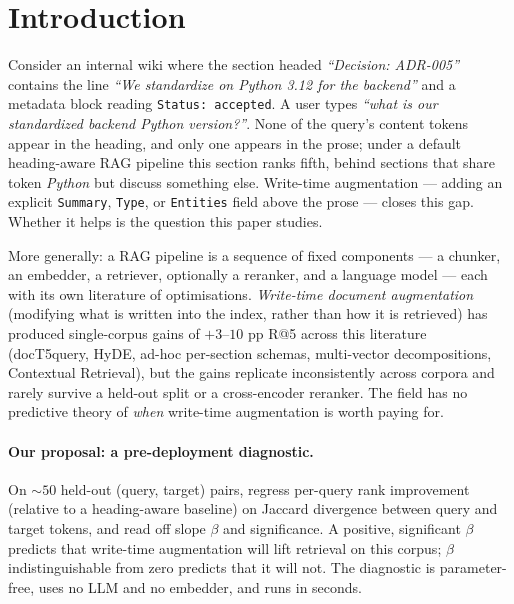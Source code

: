 \documentclass[11pt]{article}
\begin{document}
\section{Introduction}
\label{sec:intro}

Consider an internal wiki where the section headed
\textit{``Decision: ADR-005''} contains the line
\textit{``We standardize on Python 3.12 for the backend''} and a
metadata block reading \texttt{Status: accepted}. A user types
\textit{``what is our standardized backend Python version?''}. None
of the query's content tokens appear in the heading, and only one
appears in the prose; under a default heading-aware RAG pipeline this
section ranks fifth, behind sections that share token \emph{Python}
but discuss something else. Write-time augmentation --- adding an
explicit \texttt{Summary}, \texttt{Type}, or \texttt{Entities} field
above the prose --- closes this gap. Whether it helps is the question
this paper studies.

More generally: a RAG pipeline is a sequence of fixed components ---
a chunker, an embedder, a retriever, optionally a reranker, and a
language model --- each with its own literature of optimisations.
\emph{Write-time document augmentation} (modifying what is written
into the index, rather than how it is retrieved) has produced
single-corpus gains of $+3$--$10$ pp R@5 across this literature
(docT5query, HyDE, ad-hoc per-section schemas, multi-vector
decompositions,
Contextual Retrieval), but the gains replicate inconsistently across
corpora and rarely survive a held-out split or a cross-encoder
reranker. The field has no predictive theory of \emph{when} write-time
augmentation is worth paying for.

\paragraph{Our proposal: a pre-deployment diagnostic.} On $\sim 50$
held-out (query, target) pairs, regress per-query rank improvement
(relative to a heading-aware baseline) on Jaccard divergence between
query and target tokens, and read off slope $\beta$ and significance.
A positive, significant $\beta$ predicts that write-time augmentation
will lift retrieval on this corpus; $\beta$ indistinguishable from
zero predicts that it will not. The diagnostic is parameter-free,
uses no LLM and no embedder, and runs in seconds.
\end{document}
